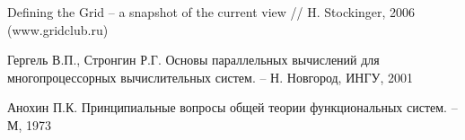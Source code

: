 \documentclass[a4paper,11pt,draft]{article} %
\begin{document}
	\newpage
	
	\begin{thebibliography}{99}
		
		Defining the Grid -- a snapshot of the current view // H. Stockinger, 2006 (www.gridclub.ru)
		
		Гергель В.П., Стронгин Р.Г. Основы параллельных вычислений для многопроцессорных вычислительных систем. -- Н. Новгород, ИНГУ, 2001
		
		Анохин П.К. Принципиальные вопросы общей теории функциональных систем. -- М, 1973
		
	\end{thebibliography}
\end{document}
